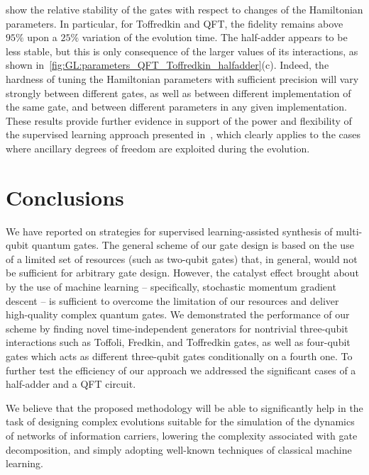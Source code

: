  show the relative stability of the gates with respect to changes of the Hamiltonian parameters.
In particular, for Toffredkin and \ac{QFT}, the fidelity remains above $95\%$ upon a $25\%$ variation of the evolution time.
The half-adder appears to be less stable, but this is only consequence of the larger values of its interactions, as shown in~\cref{fig:GL:parameters_QFT_Toffredkin_halfadder}(c).
Indeed, the hardness of tuning the Hamiltonian parameters with sufficient precision will vary strongly between different gates, as well as between different implementation of the same gate, and between different parameters in any given implementation.
These results provide further evidence in support of the power and flexibility of the supervised learning approach presented in~\cite{innocenti2018supervised,banchi2016quantum}, which clearly applies to the cases where ancillary degrees of freedom are exploited during the evolution.


\section{Conclusions}
\label{sec:GL:conclusions}

We have reported on strategies for supervised learning-assisted synthesis of multi-qubit quantum gates. The general scheme of our gate design is based on the use of a limited set of resources (such as two-qubit gates) that, in general, would not be sufficient for arbitrary gate design. However, the catalyst effect brought about by the use of machine learning -- specifically, stochastic momentum gradient descent -- is sufficient to overcome the limitation of our resources and deliver high-quality complex quantum gates.
We demonstrated the performance of our scheme by finding novel time-independent generators for nontrivial three-qubit interactions such as Toffoli, Fredkin, and Toffredkin gates, as well as four-qubit gates which acts as different three-qubit gates conditionally on a fourth one.
To further test the efficiency of our approach we addressed the significant cases of a half-adder and a \ac{QFT} circuit.

We believe that the proposed methodology will be able to significantly help in the task of designing complex evolutions suitable for the simulation of the dynamics of networks of information carriers, lowering the complexity associated with gate decomposition, and simply adopting well-known techniques of classical machine learning.

